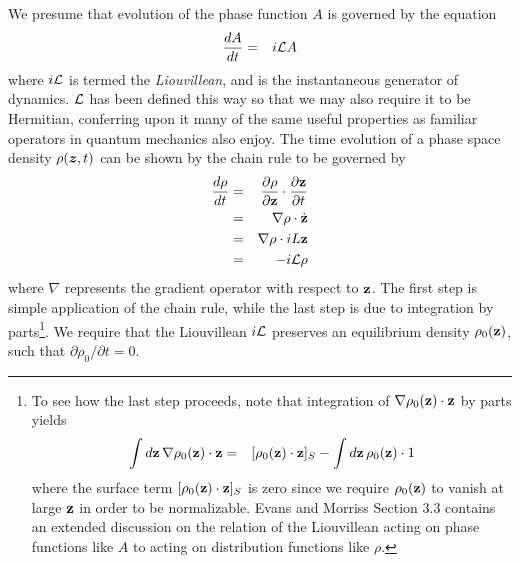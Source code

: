 We presume that evolution of the phase function $A$ is governed by the equation
\begin{eqnarray}
\frac{dA}{dt} &=& i \mathcal{L} A \label{equation:liouville-equation}
\end{eqnarray}
where $i \mathcal{L}$ is termed the \emph{Liouvillean}, and is the instantaneous generator of dynamics.  \label{notation:liouvillean}
$\mathcal{L}$ has been defined this way so that we may also require it to be Hermitian, conferring upon it many of the same useful properties as familiar operators in quantum mechanics also enjoy.  
The time evolution of a phase space density $\rho({\mbox{\boldmath{$z$}}},t)$ can be shown by the chain rule to be governed by
\begin{eqnarray}
\frac{d\rho}{dt} &=& \frac{\partial \rho}{\partial {\bf z}} \cdot \frac{\partial {\bf z}}{\partial t} \nonumber \\
&=& \nabla \rho \cdot \dot {{\bf z}} \nonumber \\
&=& \nabla \rho \cdot iL {\bf z} \nonumber \\
&=& - i \mathcal{L} \rho \label{equation:liouville-equation-density}
\end{eqnarray}
where $\nabla$ represents the gradient operator with respect to ${\bf z}$.  
The first step is simple application of the chain rule, while the last step is due to integration by parts\footnote{To see how the last step proceeds, note that integration of $\nabla \rho_0({\bf z}) \cdot {\bf z}$ by parts yields
\begin{eqnarray}
\int d{\bf z} \, \nabla \rho_0({\bf z}) \cdot {\bf z} &=& [\rho_0({\bf z}) \cdot {\bf z}]_S - \int d{\bf z} \, \rho_0({\bf z}) \cdot 1
\end{eqnarray}
where the surface term $[\rho_0({\bf z}) \cdot {\bf z}]_S$ is zero since we require $\rho_0({\bf z})$ to vanish at large ${\bf z}$ in order to be normalizable.  
Evans and Morriss \cite{evans:statistical-mechanics-of-nonequilibrium-liquids} Section 3.3 contains an extended discussion on the relation of the Liouvillean acting on phase functions like $A$ to acting on distribution functions like $\rho$.}.  
We require that the Liouvillean $i \mathcal{L}$ preserves an equilibrium density $\rho_0({\bf z})$, such that $\partial \rho_0 / \partial t = 0$.

